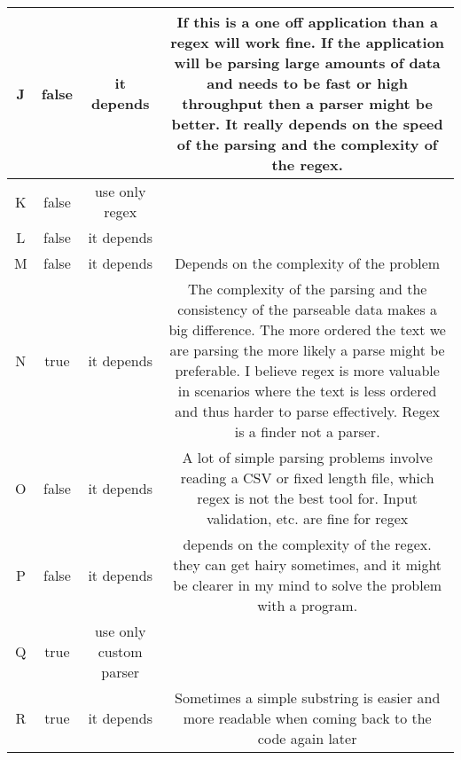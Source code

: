 \begin{table}
\begin{tabular}{|c|c|c|c|}
\hline
J & false & it depends &\begin{minipage}{3.6in} If this is a one off application than a regex will work fine. If the application will be parsing large amounts of data and needs to be fast or high throughput then a parser might be better. It really depends on the speed of the parsing and the complexity of the regex.\end{minipage} \\
\hline
K & false & use only regex &\begin{minipage}{3.6in} \end{minipage} \\
\hline
L & false & it depends &\begin{minipage}{3.6in} \end{minipage} \\
\hline
M & false & it depends &\begin{minipage}{3.6in} Depends on the complexity of the problem\end{minipage} \\
\hline
N & true & it depends &\begin{minipage}{3.6in} The complexity of the parsing and the consistency of the parseable data makes a big difference. The more ordered the text we are parsing the more likely a parse might be preferable. I believe regex is more valuable in scenarios where the text is less ordered and thus harder to parse effectively. Regex is a finder not a parser.\end{minipage} \\
\hline
O & false & it depends &\begin{minipage}{3.6in} A lot of simple parsing problems involve reading a CSV or fixed length file, which regex is not the best tool for. Input validation, etc. are fine for regex\end{minipage} \\
\hline
P & false & it depends &\begin{minipage}{3.6in} depends on the complexity of the regex. they can get hairy sometimes, and it might be clearer in my mind to solve the problem with a program.\end{minipage} \\
\hline
Q & true & use only custom parser &\begin{minipage}{3.6in} \end{minipage} \\
\hline
R & true & it depends &\begin{minipage}{3.6in} Sometimes a simple substring is easier and more readable when coming back to the code again later\end{minipage} \\

\end{tabular}
\end{table}
